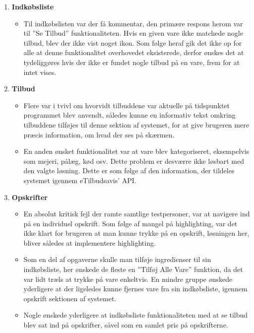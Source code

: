 \begin{enumerate}
   \item \textbf{Indkøbsliste} \begin{itemize}
   								  \item Til indkøbslisten var der få kommentar, den primære respons herom var til ''Se Tilbud'' funktionaliteten. Hvis en given vare ikke matchede nogle tilbud, blev der ikke vist noget ikon. Som følge heraf gik det ikke op for alle at denne funktionalitet overhovedet eksisterede, derfor ønskes det at tydeliggøres hvis der ikke er fundet nogle tilbud på en vare, frem for at intet vises.
   							   \end{itemize}
   \item \textbf{Tilbud}\begin{itemize}
   								  \item Flere var i tvivl om hvorvidt tilbuddene var aktuelle på tidspunktet programmet blev anvendt, således kunne en informativ tekst omkring tilbuddene tilføjes til denne sektion af systemet, for at give brugeren mere præcis information, om hvad der ses på skærmen.
   								  \item En anden ønsket funktionalitet var at vare blev kategoriseret, eksempelvis som mejeri, pålæg, kød osv. Dette problem er desværre ikke løsbart med den valgte løsning.
   								  Dette er som følge af den information, der tildeles systemet igennem eTilbudsavis' API.
   							   \end{itemize}
   \item \textbf{Opskrifter}\begin{itemize}
   								  \item En absolut kritisk fejl der ramte samtlige testpersoner, var at navigere ind på en individuel opskrift. Som følge af mangel på highlighting, var det ikke klart for brugeren at man kunne trykke på en opskrift, løsningen her, bliver således at implementere highlighting.
   								  \item Som en del af opgaverne skulle man tilføje ingredienser til sin indkøbsliste, her ønskede de fleste en ''Tilføj Alle Vare'' funktion, da det var lidt træls at trykke på vare enkeltvis. 
   								  En mindre gruppe ønskede yderligere at der ligeledes kunne fjernes vare fra sin indkøbsliste, igennem opskrift sektionen af systemet.
   								  \item Nogle ønskede yderligere at indkøbsliste funktionaliteten med at se tilbud blev sat ind på opskrifter, såvel som en samlet pris på opskrifterne.

\end{itemize}
\end{enumerate}
